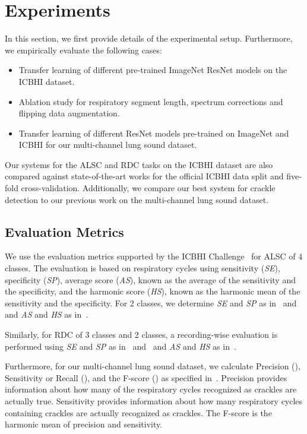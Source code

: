 \documentclass[journal]{IEEEtran}
\begin{document}
\section{Experiments}
\label{sec:experiments}
In this section, we first provide details of the experimental setup. Furthermore, we empirically evaluate the following cases:
\begin{itemize}
    \item Transfer learning of different pre-trained ImageNet ResNet models on the ICBHI dataset.
	\item Ablation study for respiratory segment length, spectrum corrections and flipping data augmentation.
	\item Transfer learning of different ResNet models pre-trained on ImageNet and ICBHI for our multi-channel lung sound dataset.
\end{itemize}
Our systems for the ALSC and RDC tasks on the ICBHI dataset are also compared against state-of-the-art works for the official ICBHI data split and five-fold cross-validation. Additionally, we compare our best system for crackle detection to our previous work on the multi-channel lung sound dataset.

\subsection{Evaluation Metrics}
We use the evaluation metrics supported by the ICBHI Challenge~\cite{rocha2018alpha} for ALSC of 4 classes. The evaluation is based on respiratory cycles using sensitivity (\textit{SE}), specificity (\textit{SP}), average score (\textit{AS}), known as the average of the sensitivity and the specificity, and the harmonic score (\textit{HS}), known as the harmonic mean of the sensitivity and the specificity. For 2 classes, we determine \textit{SE} and \textit{SP} as in~\cite{dPerna2019lstm} and~\cite{pham2021cnn} and \textit{AS} and \textit{HS} as in~\cite{rocha2018alpha}.   

Similarly, for RDC of 3 classes and 2 classes, a recording-wise evaluation is performed using \textit{SE} and \textit{SP} as in~\cite{dPerna2019lstm} and~\cite{pham2021cnn} and \textit{AS} and \textit{HS} as in~\cite{rocha2018alpha}.   

Furthermore, for our multi-channel lung sound dataset, we calculate Precision (), Sensitivity or Recall (), and the F-score () as specified in~\cite{messner2018crackle}.
Precision  provides information about how many of the respiratory cycles recognized as crackles are actually true. Sensitivity  provides information about how many respiratory cycles containing crackles are actually recognized as crackles. The F-score is the harmonic mean of precision and sensitivity.
\end{document}
